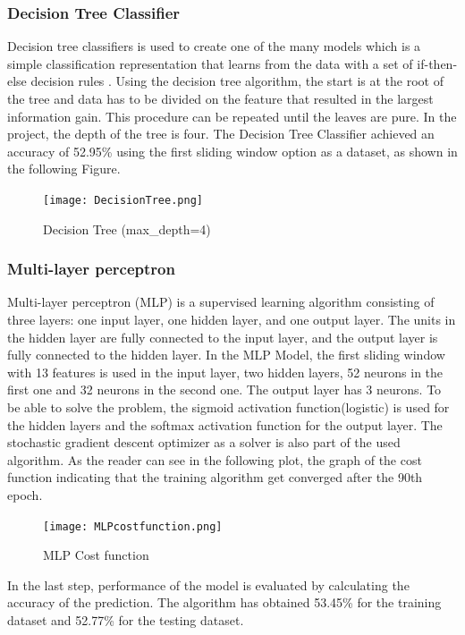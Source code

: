 \subsubsection{Decision Tree Classifier}

Decision tree classifiers is used to create one of the many models which is a simple classification representation that learns from the data with a set of if-then-else decision rules \cite{DecisionTree:scikit-learn}. \newline 
Using the decision tree algorithm, the start is at the root of the tree and data has to be divided on the feature that resulted in the largest information gain. This procedure can be repeated until the leaves are pure.\newline \newline
In the project, the depth of the tree is four.\newline
The Decision Tree Classifier achieved an accuracy of 52.95\% using the first sliding window option as a dataset, as shown in the following Figure.
\begin{figure}[H]
\begin{center}
\texttt{[image: DecisionTree.png]}
\end{center}
\caption{Decision Tree (max\_depth=4)}
\label{fig:DecisionTree}
\end{figure}


\subsubsection{Multi-layer perceptron}

Multi-layer perceptron (MLP) is a supervised learning algorithm consisting of three layers: one input layer, one hidden layer, and one output layer. The units in the hidden layer are fully connected to the input layer, and the output layer is fully connected to the hidden layer\cite{PythonMachineLearning}. \newline
In the MLP Model, the first sliding window with 13 features is used in the input layer, two hidden layers, 52 neurons in the first one and 32 neurons in the second one. The output layer has 3 neurons.\newline \newline 
To be able to solve the problem, the sigmoid activation function(logistic) is used for the hidden layers and the softmax activation function for the output layer. The stochastic gradient descent optimizer as a solver is also part of the used algorithm. \newline 
As the reader can see in the following plot, the graph of the cost function indicating that the training algorithm get converged after the 90th epoch. \newline
\begin{figure}[H]
\begin{center}
\texttt{[image: MLPcostfunction.png]}
\end{center}
\caption{MLP Cost function}
\label{fig:MLPcostfunction}
\end{figure}
In the last step, performance of the model is evaluated by calculating the accuracy of the prediction. The algorithm has obtained 53.45\% for the training dataset and 52.77\% for the testing dataset.


